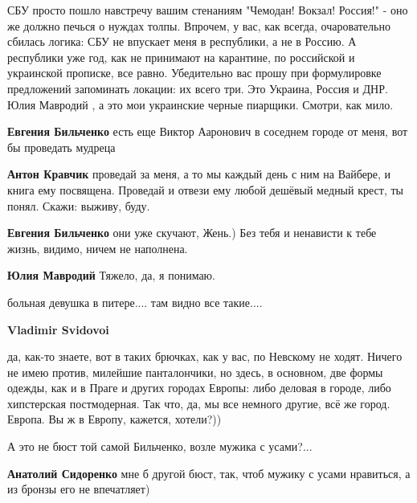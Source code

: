 \begin{itemize}
\begin{itemize}
СБУ просто пошло навстречу вашим стенаниям "Чемодан! Вокзал! Россия!" - оно же
должно печься о нуждах толпы. Впрочем, у вас, как всегда, очаровательно сбилась
логика: СБУ не впускает меня в республики, а не в Россию. А республики уже год,
как не принимают на карантине, по российской и украинской прописке, все равно.
Убедительно вас прошу при формулировке предложений запоминать локации: их всего
три. Это Украина, Россия и ДНР. Юлия Мавродий , а это мои украинские черные
пиарщики. Смотри, как мило.

\textbf{Евгения Бильченко} есть еще Виктор Ааронович в соседнем городе от меня, вот бы проведать мудреца

\textbf{Антон Кравчик} проведай за меня, а то мы каждый день с ним на Вайбере, и книга ему посвящена. Проведай и отвези ему любой дешёвый медный крест, ты понял. Скажи: выживу, буду.

\textbf{Евгения Бильченко} они уже скучают, Жень.) Без тебя и ненависти к тебе жизнь, видимо, ничем не наполнена.

\textbf{Юлия Мавродий} Тяжело, да, я понимаю.
\end{itemize} %

больная девушка в питере.... там видно все такие....

\begin{itemize} %
\textbf{Vladimir Svidovoi} 

да, как-то знаете, вот в таких брючках, как у вас, по Невскому не ходят. Ничего
не имею против, милейшие панталончики, но здесь, в основном, две формы одежды,
как и в Праге и других городах Европы: либо деловая в городе, либо хипстерская
постмодерная. Так что, да, мы все немного другие, всё же город. Европа. Вы ж в
Европу, кажется, хотели?))

\end{itemize} %

А это не бюст той самой Бильченко, возле мужика с усами?...

\begin{itemize} %
\textbf{Анатолий Сидоренко} мне б другой бюст, так, чтоб мужику с усами нравиться, а из бронзы его не впечатляет)
\end{itemize} %

\end{itemize} %

